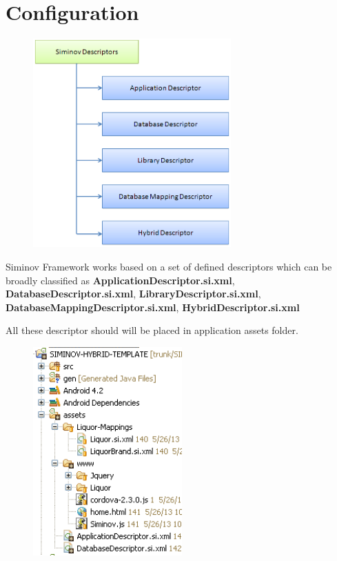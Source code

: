 \newpage
\chapter {\Large{Configuration}}

\begin{figure}[htbp]
	\centering
		\includegraphics[height=8cm]{Resources/siminov_descriptors.png}
\end{figure}

\par
Siminov Framework works based on a set of defined descriptors which can be broadly classified as \textbf{ApplicationDescriptor.si.xml}, \textbf{DatabaseDescriptor.si.xml}, \textbf{LibraryDescriptor.si.xml}, \textbf{DatabaseMappingDescriptor.si.xml}, \textbf{HybridDescriptor.si.xml}

\par
All these descriptor should will be placed in application assets folder. 

\newpage
\begin{figure}[!htbp]
	\centering
		\includegraphics[height=8cm]{Resources/application_assests_structure.png}
\end{figure}


